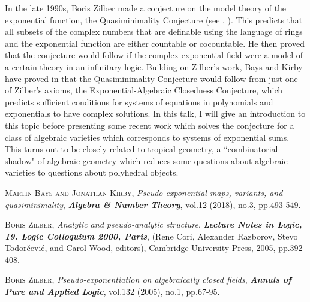 \documentclass[bsl,meeting]{asl}
\begin{document}
In the late 1990s, Boris Zilber made a conjecture on the model theory of the exponential function, the Quasiminimality Conjecture (see \cite{Zil00}, \cite{Zil05}). This predicts that all subsets of the complex numbers that are definable using the language of rings and the exponential function are either countable or cocountable. He then proved that the conjecture would follow if the complex exponential field were a model of a certain theory in an infinitary logic.
Building on Zilber's work, Bays and Kirby have proved in \cite{BK18} that the Quasiminimality Conjecture would follow from just one of Zilber's axioms, the Exponential-Algebraic Closedness Conjecture, which predicts sufficient conditions for systems of equations in polynomials and exponentials to have complex solutions.
In this talk, I will give an introduction to this topic before presenting some recent work which solves the conjecture for a class of algebraic varieties which corresponds to systems of exponential sums. This turns out to be closely related to tropical geometry, a ``combinatorial shadow" of algebraic geometry which reduces some questions about algebraic varieties to questions about polyhedral objects.
\begin{thebibliography}{10}
	{\scshape Martin Bays and Jonathan Kirby},
	{\itshape Pseudo-exponential maps, variants, and quasiminimality},
	{\bfseries\itshape Algebra \& Number Theory},
	vol.12 (2018), no.3, pp.493-549.


	{\scshape Boris Zilber},
	{\itshape Analytic and pseudo-analytic structure},
	{\bfseries\itshape Lecture Notes in Logic, 19. Logic Colloquium 2000, Paris},
	(Rene Cori, Alexander Razborov, Stevo Todor\v{c}evi\'c, and Carol Wood, editors),
	Cambridge University Press,
	2005,
	pp.392-408.

	{\scshape Boris Zilber},
	{\itshape Pseudo-exponentiation on algebraically closed fields},
	{\bfseries\itshape Annals of Pure and Applied Logic},
	vol.132 (2005), no.1, pp.67-95.
\end{thebibliography}
\end{document}

